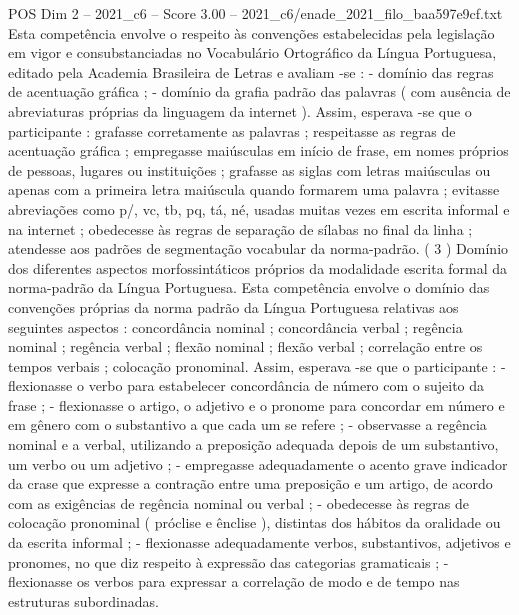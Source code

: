 \begin{textsample}{POS Dim 2 – 2021\_c6 – Score 3.00 – 2021\_c6/enade\_2021\_filo\_baa597e9cf.txt}
Esta competência envolve o respeito às convenções estabelecidas pela legislação em vigor e consubstanciadas no Vocabulário Ortográfico da Língua Portuguesa, editado pela Academia Brasileira de Letras e avaliam -se : - domínio das regras de acentuação gráfica ; - domínio da grafia padrão das palavras ( com ausência de abreviaturas próprias da linguagem da internet ).
Assim, esperava -se que o participante : grafasse corretamente as palavras ; respeitasse as regras de acentuação gráfica ; empregasse maiúsculas em início de frase, em nomes próprios de pessoas, lugares ou instituições ; grafasse as siglas com letras maiúsculas ou apenas com a primeira letra maiúscula quando formarem uma palavra ; evitasse abreviações como p/, vc, tb, pq, tá, né, usadas muitas vezes em escrita informal e na internet ; obedecesse às regras de separação de sílabas no final da linha ; atendesse aos padrões de segmentação vocabular da norma-padrão. ( 3 ) Domínio dos diferentes aspectos morfossintáticos próprios da modalidade escrita formal da norma-padrão da Língua Portuguesa.
Esta competência envolve o domínio das convenções próprias da norma padrão da Língua Portuguesa relativas aos seguintes aspectos : concordância nominal ; concordância verbal ; regência nominal ; regência verbal ; flexão nominal ; flexão verbal ; correlação entre os tempos verbais ; colocação pronominal.
Assim, esperava -se que o participante : - flexionasse o verbo para estabelecer concordância de número com o sujeito da frase ; - flexionasse o artigo, o adjetivo e o pronome para concordar em número e em gênero com o substantivo a que cada um se refere ; - observasse a regência nominal e a verbal, utilizando a preposição adequada depois de um substantivo, um verbo ou um adjetivo ; - empregasse adequadamente o acento grave indicador da crase que expresse a contração entre uma preposição e um artigo, de acordo com as exigências de regência nominal ou verbal ; - obedecesse às regras de colocação pronominal ( próclise e ênclise ), distintas dos hábitos da oralidade ou da escrita informal ; - flexionasse adequadamente verbos, substantivos, adjetivos e pronomes, no que diz respeito à expressão das categorias gramaticais ; - flexionasse os verbos para expressar a correlação de modo e de tempo nas estruturas subordinadas.

\end{textsample}
